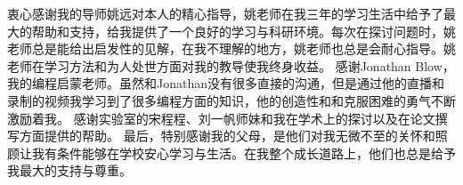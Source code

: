 
\begin{acknowledgements}
衷心感谢我的导师姚远对本人的精心指导，姚老师在我三年的学习生活中给予了最大的帮助和支持，给我提供了一个良好的学习与科研环境。每次在探讨问题时，姚老师总是能给出启发性的见解，在我不理解的地方，姚老师也总是会耐心指导。姚老师在学习方法和为人处世方面对我的教导使我终身收益。 
%
感谢Jonathan Blow，我的编程启蒙老师。虽然和Jonathan没有很多直接的沟通，但是通过他的直播和录制的视频我学习到了很多编程方面的知识，他的创造性和和克服困难的勇气不断激励着我。
%
感谢实验室的宋程程、刘一帆师妹和我在学术上的探讨以及在论文撰写方面提供的帮助。
%
最后，特别感谢我的父母，是他们对我无微不至的关怀和照顾让我有条件能够在学校安心学习与生活。在我整个成长道路上，他们也总是给予我最大的支持与尊重。
\end{acknowledgements}
